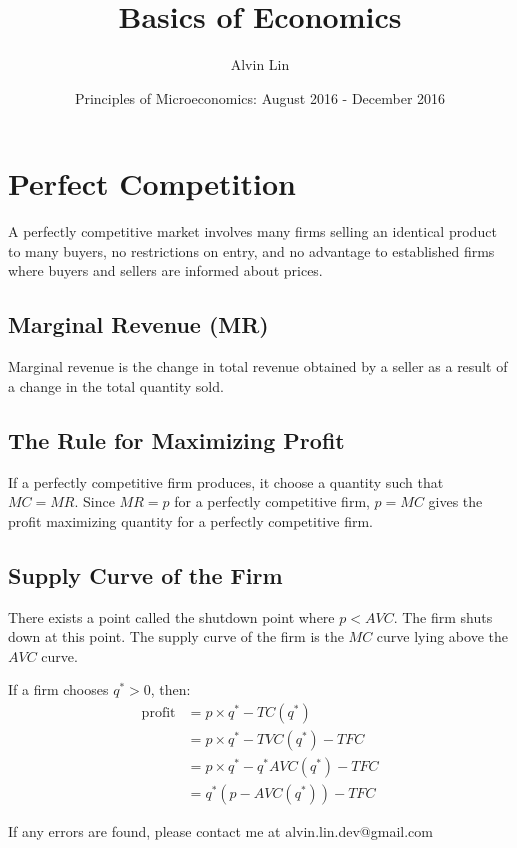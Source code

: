 \documentclass[letterpaper, 12pt]{article}
\title{Basics of Economics}
\author{Alvin Lin}
\date{Principles of Microeconomics: August 2016 - December 2016}
\begin{document}
\maketitle

\section{Perfect Competition}
A perfectly competitive market involves many firms selling an identical product
to many buyers, no restrictions on entry, and no advantage to established firms
where buyers and sellers are informed about prices.

\subsection{Marginal Revenue (MR)}
Marginal revenue is the change in total revenue obtained by a seller as a
result of a change in the total quantity sold.

\subsection{The Rule for Maximizing Profit}
If a perfectly competitive firm produces, it choose a quantity such that
\( MC = MR \). Since \( MR = p \) for a perfectly competitive firm,
\( p = MC \) gives the profit maximizing quantity for a perfectly competitive
firm.

\subsection{Supply Curve of the Firm}
There exists a point called the shutdown point where \( p < AVC \). The firm
shuts down at this point. The supply curve of the firm is the \( MC \) curve
lying above the \( AVC \) curve. \par
If a firm chooses \( q^{*} > 0 \), then:
\begin{align*}
  \mathrm{profit} &= p \times q^{*}-TC(q^{*}) \\
  &= p \times q^{*}-TVC(q^{*})-TFC \\
  &= p \times q^{*}-q^{*}AVC(q^{*})-TFC \\
  &= q^{*}(p-AVC(q^{*}))-TFC
\end{align*}

\begin{center}
  If any errors are found, please contact me at alvin.lin.dev@gmail.com
\end{center}
\end{document}
